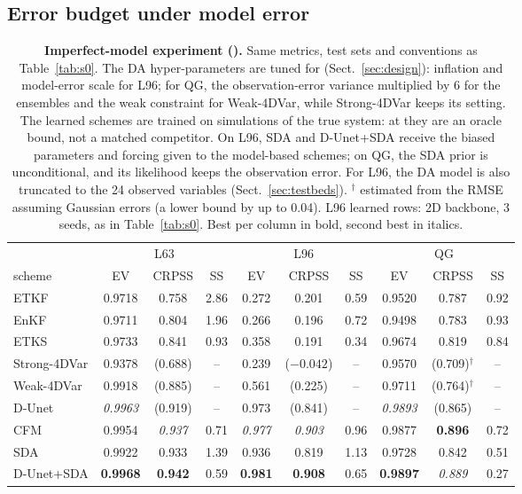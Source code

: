 \subsection{Error budget under model error}\label{sec:q2}
\begin{table}[t]
\centering\small
\setlength{\tabcolsep}{4pt}
\caption{\textbf{Imperfect-model experiment (\So).} Same metrics, test sets and
conventions as Table~\ref{tab:s0}. The DA hyper-parameters are tuned for \So{}
(Sect.~\ref{sec:design}): inflation and model-error scale for L96; for QG, the
observation-error variance multiplied by 6 for the ensembles and the weak constraint for
Weak-4DVar, while Strong-4DVar keeps its \Sz{} setting. The learned schemes are trained
on simulations of the true system: at \So{} they are an oracle bound, not a matched
competitor. On L96, SDA and D-Unet+SDA receive the biased parameters and forcing given to
the model-based schemes; on QG, the SDA prior is unconditional, and its likelihood keeps the
\Sz{} observation error. For L96, the \So{} DA model is also truncated to the 24 observed
variables (Sect.~\ref{sec:testbeds}). $^\dagger$ estimated from the RMSE assuming Gaussian errors (a lower
bound by up to 0.04). L96 learned rows: 2D backbone, 3 seeds, as in Table~\ref{tab:s0}. Best per column in bold, second best in italics.}
\label{tab:s1}
\begin{tabular}{lccccccccc}
\toprule
 & \multicolumn{3}{c}{L63} & \multicolumn{3}{c}{L96} & \multicolumn{3}{c}{QG} \\
\cmidrule(lr){2-4}\cmidrule(lr){5-7}\cmidrule(lr){8-10}
scheme & EV & CRPSS & SS & EV & CRPSS & SS & EV & CRPSS & SS \\
\midrule
ETKF            & 0.9718 & 0.758 & 2.86 & 0.272 & 0.201 & 0.59 & 0.9520 & 0.787 & 0.92 \\
EnKF            & 0.9711 & 0.804 & 1.96 & 0.266 & 0.196 & 0.72 & 0.9498 & 0.783 & 0.93 \\
ETKS            & 0.9733 & 0.841 & 0.93 & 0.358 & 0.191 & 0.34 & 0.9674 & 0.819 & 0.84 \\
Strong-4DVar    & 0.9378 & (0.688) & -- & 0.239 & ($-0.042$) & -- & 0.9570 & (0.709)$^\dagger$ & -- \\
Weak-4DVar      & 0.9918 & (0.885) & -- & 0.561 & (0.225) & -- & 0.9711 & (0.764)$^\dagger$ & -- \\
\midrule
D-Unet          & \textit{0.9963} & (0.919) & -- & 0.973 & (0.841) & -- & \textit{0.9893} & (0.865) & -- \\
CFM             & 0.9954 & \textit{0.937} & 0.71 & \textit{0.977} & \textit{0.903} & 0.96 & 0.9877 & \textbf{0.896} & 0.72 \\
SDA             & 0.9922 & 0.933 & 1.39 & 0.936 & 0.819 & 1.13 & 0.9728 & 0.842 & 0.51 \\
D-Unet+SDA      & \textbf{0.9968} & \textbf{0.942} & 0.59 & \textbf{0.981} & \textbf{0.908} & 0.65 & \textbf{0.9897} & \textit{0.889} & 0.27 \\
\bottomrule
\end{tabular}
\end{table}

